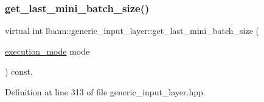 \subsubsection{\texorpdfstring{get\+\_\+last\+\_\+mini\+\_\+batch\+\_\+size()}{get\_last\_mini\_batch\_size()}\hspace{0.1cm}{\footnotesize\ttfamily [1/2]}}
{\footnotesize\ttfamily virtual int lbann\+::generic\+\_\+input\+\_\+layer\+::get\+\_\+last\+\_\+mini\+\_\+batch\+\_\+size (\begin{DoxyParamCaption}\item[{\hyperlink{base_8hpp_a2781a159088df64ed7d47cc91c4dc0a8}{execution\+\_\+mode}}]{mode }\end{DoxyParamCaption}) const\hspace{0.3cm}{\ttfamily [inline]}, {\ttfamily [virtual]}}



Definition at line 313 of file generic\+\_\+input\+\_\+layer.\+hpp.


